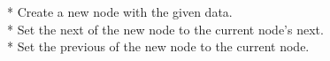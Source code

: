 \documentclass[preview]{standalone}
\begin{document}
*   Create a new node with the given data.\\*   Set the next of the new node to the current node's next.\\*   Set the previous of the new node to the current node.\\
\end{document}
